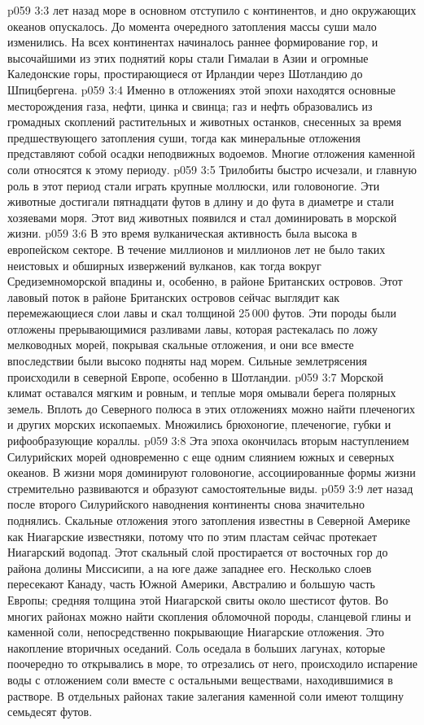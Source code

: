 \vs p059 3:3 \pc {} лет назад море в основном отступило с континентов, и дно окружающих океанов опускалось. До момента очередного затопления массы суши мало изменились. На всех континентах начиналось раннее формирование гор, и высочайшими из этих поднятий коры стали Гималаи в Азии и огромные Каледонские горы, простирающиеся от Ирландии через Шотландию до Шпицбергена.
\vs p059 3:4 Именно в отложениях этой эпохи находятся основные месторождения газа, нефти, цинка и свинца; газ и нефть образовались из громадных скоплений растительных и животных останков, снесенных за время предшествующего затопления суши, тогда как минеральные отложения представляют собой осадки неподвижных водоемов. Многие отложения каменной соли относятся к этому периоду.
\vs p059 3:5 Трилобиты быстро исчезали, и главную роль в этот период стали играть крупные моллюски, или головоногие. Эти животные достигали пятнадцати футов в длину и до фута в диаметре и стали хозяевами моря. Этот вид животных появился  и стал доминировать в морской жизни.
\vs p059 3:6 В это время вулканическая активность была высока в европейском секторе. В течение миллионов и миллионов лет не было таких неистовых и обширных извержений вулканов, как тогда вокруг Средиземноморской впадины и, особенно, в районе Британских островов. Этот лавовый поток в районе Британских островов сейчас выглядит как перемежающиеся слои лавы и скал толщиной 25\,000 футов. Эти породы были отложены прерывающимися разливами лавы, которая растекалась по ложу мелководных морей, покрывая скальные отложения, и они все вместе впоследствии были высоко подняты над морем. Сильные землетрясения происходили в северной Европе, особенно в Шотландии.
\vs p059 3:7 Морской климат оставался мягким и ровным, и теплые моря омывали берега полярных земель. Вплоть до Северного полюса в этих отложениях можно найти плеченогих и других морских ископаемых. Множились брюхоногие, плеченогие, губки и рифообразующие кораллы.
\vs p059 3:8 Эта эпоха окончилась вторым наступлением Силурийских морей одновременно с еще одним слиянием южных и северных океанов. В жизни моря доминируют головоногие, ассоциированные формы жизни стремительно развиваются и образуют самостоятельные виды.
\vs p059 3:9 \pc {} лет назад после второго Силурийского наводнения континенты снова значительно поднялись. Скальные отложения этого затопления известны в Северной Америке как Ниагарские известняки, потому что по этим пластам сейчас протекает Ниагарский водопад. Этот скальный слой простирается от восточных гор до района долины Миссисипи, а на юге даже западнее его. Несколько слоев пересекают Канаду, часть Южной Америки, Австралию и большую часть Европы; средняя толщина этой Ниагарской свиты около шестисот футов. Во многих районах можно найти скопления обломочной породы, сланцевой глины и каменной соли, непосредственно покрывающие Ниагарские отложения. Это накопление вторичных оседаний. Соль оседала в больших лагунах, которые поочередно то открывались в море, то отрезались от него, происходило испарение воды с отложением соли вместе с остальными веществами, находившимися в растворе. В отдельных районах такие залегания каменной соли имеют толщину семьдесят футов.
